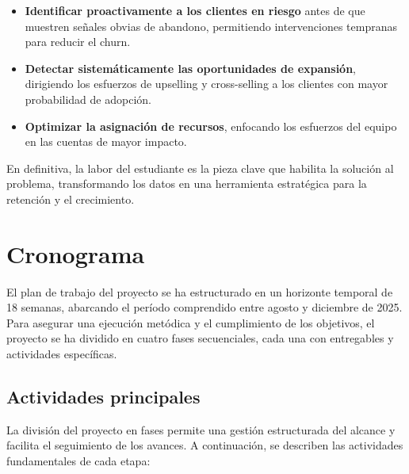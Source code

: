 \begin{itemize}
    \item \textbf{Identificar proactivamente a los clientes en riesgo} antes de que muestren señales obvias de abandono, permitiendo intervenciones tempranas para reducir el churn.
    \item \textbf{Detectar sistemáticamente las oportunidades de expansión}, dirigiendo los esfuerzos de upselling y cross-selling a los clientes con mayor probabilidad de adopción.
    \item \textbf{Optimizar la asignación de recursos}, enfocando los esfuerzos del equipo en las cuentas de mayor impacto.
\end{itemize}

En definitiva, la labor del estudiante es la pieza clave que habilita la solución al problema, transformando los datos en una herramienta estratégica para la retención y el crecimiento.

\section{Cronograma}
El plan de trabajo del proyecto se ha estructurado en un horizonte temporal de 18 semanas, abarcando el período comprendido entre agosto y diciembre de 2025. Para asegurar una ejecución metódica y el cumplimiento de los objetivos, el proyecto se ha dividido en cuatro fases secuenciales, cada una con entregables y actividades específicas.

\subsection{Actividades principales}
La división del proyecto en fases permite una gestión estructurada del alcance y facilita el seguimiento de los avances. A continuación, se describen las actividades fundamentales de cada etapa:

